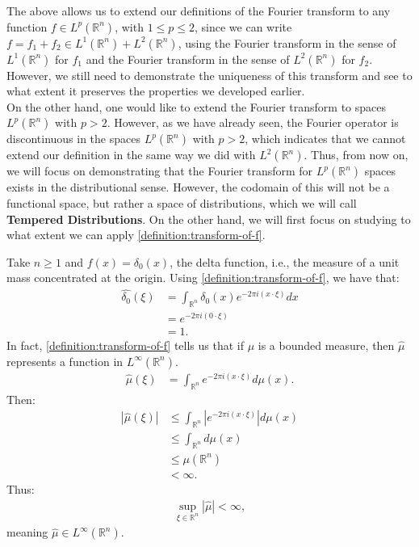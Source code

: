 The above allows us to extend our definitions of the Fourier transform to any function $f \in L^p(\mathbb{R}^n)$, with $1 \leq p \leq 2$, since we can write $f = f_1 + f_2 \in L^1(\mathbb{R}^n) + L^2(\mathbb{R}^n)$, using the Fourier transform in the sense of $L^1(\mathbb{R}^n)$ for $f_1$ and the Fourier transform in the sense of $L^2(\mathbb{R}^n)$ for $f_2$. However, we still need to demonstrate the uniqueness of this transform and see to what extent it preserves the properties we developed earlier.\\
On the other hand, one would like to extend the Fourier transform to spaces $L^p(\mathbb{R}^n)$ with $p > 2$. However, as we have already seen, the Fourier operator is discontinuous in the spaces $L^p(\mathbb{R}^n)$ with $p > 2$, which indicates that we cannot extend our definition in the same way we did with $L^2(\mathbb{R}^n)$. Thus, from now on, we will focus on demonstrating that the Fourier transform for $L^p(\mathbb{R}^n)$ spaces exists in the distributional sense. However, the codomain of this will not be a functional space, but rather a space of distributions, which we will call \textbf{Tempered Distributions}. On the other hand, we will first focus on studying to what extent we can apply \cref{definition:transform-of-f}.
\begin{example}{}
  Take $n \geq 1$ and $f(x) = \delta_0(x)$, the delta function, i.e., the measure of a unit mass concentrated at the origin. Using \cref{definition:transform-of-f}, we have that:
  \begin{align*}
    \hat{\delta_0}(\xi) &= \int_{\mathbb{R}^n} \delta_0(x)e^{-2\pi i (x \cdot \xi)}dx \\
    &= e^{-2\pi i (0 \cdot \xi)} \\
    &= 1.
  \end{align*}
  \newline
  In fact, \cref{definition:transform-of-f} tells us that if $\mu$ is a bounded measure, then $\hat{\mu}$ represents a function in $L^\infty(\mathbb{R}^n)$. \\
  \begin{align*}
    \hat{\mu}(\xi) &= \int_{\mathbb{R}^n} e^{-2\pi i (x \cdot \xi)}d\mu(x).
  \end{align*}
  Then:
  \begin{align*}
    |\hat{\mu}(\xi)| &\leq \int_{\mathbb{R}^n} |e^{-2\pi i (x \cdot \xi)}|d\mu(x) \\
    &\leq \int_{\mathbb{R}^n} d\mu(x) \\
    &\leq \mu(\mathbb{R}^n) \\
    &< \infty.
  \end{align*}
  Thus:
  \begin{align*}
    \sup_{\xi \in \mathbb{R}^n} |\hat{\mu}| < \infty,
  \end{align*}
  meaning $\hat{\mu} \in L^{\infty}(\mathbb{R}^n)$.
\end{example}
